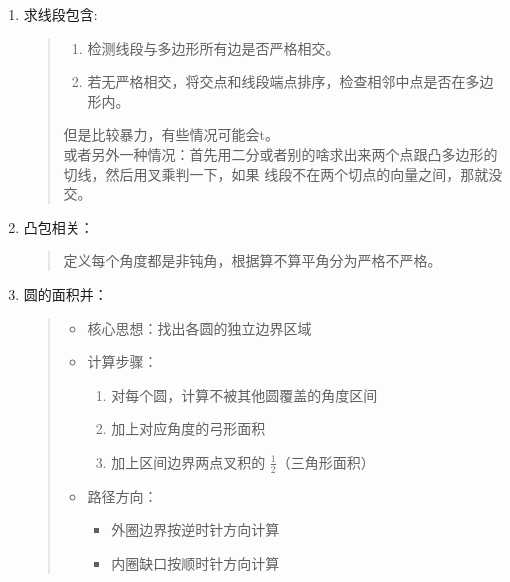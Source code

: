 \documentclass[a4paper,12pt]{article}
\begin{document}
\begin{enumerate}
    \item 求线段包含:
    \begin{quote}
    \begin{enumerate}
        \item 检测线段与多边形所有边是否严格相交。
        \item 若无严格相交，将交点和线段端点排序，检查相邻中点是否在多边形内。
    \end{enumerate}


    但是比较暴力，有些情况可能会t。
    \\

    或者另外一种情况：首先用二分或者别的啥求出来两个点跟凸多边形的切线，然后用叉乘判一下，如果
    线段不在两个切点的向量之间，那就没交。
    \end{quote}

    \item 凸包相关：
    \begin{quote}
        定义每个角度都是非钝角，根据算不算平角分为严格不严格。        
    \end{quote}

    \item 圆的面积并：
    \begin{quote}
        \begin{itemize}
            \item 核心思想：找出各圆的独立边界区域
            
            \item 计算步骤：
            \begin{enumerate}
                \item 对每个圆，计算不被其他圆覆盖的角度区间
                \item 加上对应角度的弓形面积
                \item 加上区间边界两点叉积的 \(\frac{1}{2}\)（三角形面积）
            \end{enumerate}
            
            \item 路径方向：
            \begin{itemize}
                \item 外圈边界按逆时针方向计算
                \item 内圈缺口按顺时针方向计算
            \end{itemize}
        \end{itemize}        
    \end{quote}
\end{enumerate}
\end{document}
